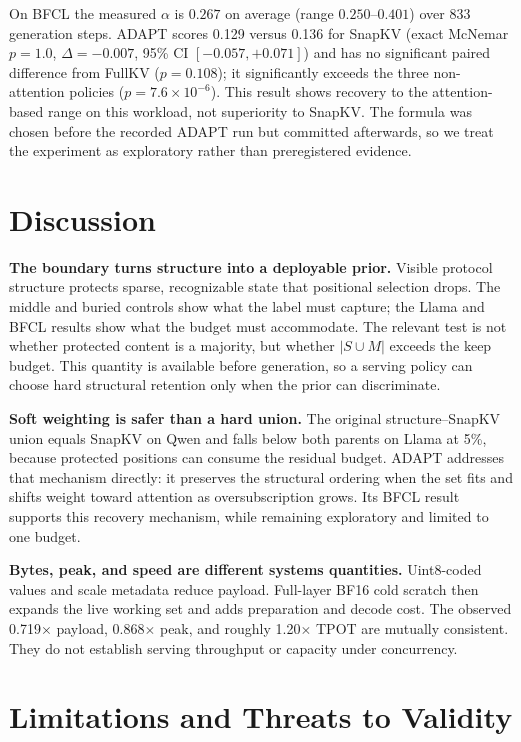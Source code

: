 On BFCL the measured $\alpha$ is $0.267$ on average (range $0.250$--$0.401$) over
833 generation steps.  ADAPT scores 0.129 versus 0.136 for SnapKV (exact McNemar
$p=1.0$, $\Delta=-0.007$, 95\% CI $[-0.057,+0.071]$) and has no significant
paired difference from FullKV ($p=0.108$); it significantly exceeds the three
non-attention policies ($p=7.6\times10^{-6}$).  This result shows recovery to the
attention-based range on this workload, not superiority to SnapKV.  The formula
was chosen before the recorded ADAPT run but committed afterwards, so we treat
the experiment as exploratory rather than preregistered evidence.

\section{Discussion}
\label{sec:discussion}

\textbf{The boundary turns structure into a deployable prior.}
Visible protocol structure protects sparse, recognizable state that positional
selection drops.  The middle and buried controls show what the label must
capture; the Llama and BFCL results show what the budget must accommodate.  The
relevant test is not whether protected content is a majority, but whether
$|S\cup M|$ exceeds the keep budget.  This quantity is available before
generation, so a serving policy can choose hard structural retention only when
the prior can discriminate.

\textbf{Soft weighting is safer than a hard union.}
The original structure--SnapKV union equals SnapKV on Qwen and falls below both
parents on Llama at 5\%, because protected positions can consume the residual
budget.  ADAPT addresses that mechanism directly: it preserves the structural
ordering when the set fits and shifts weight toward attention as
oversubscription grows.  Its BFCL result supports this recovery mechanism, while
remaining exploratory and limited to one budget.

\textbf{Bytes, peak, and speed are different systems quantities.}
Uint8-coded values and scale metadata reduce payload.  Full-layer BF16
cold scratch then expands the live working set and adds preparation and decode
cost.  The observed 0.719$\times$ payload, 0.868$\times$ peak, and roughly
1.20$\times$ TPOT are mutually consistent.  They do not establish serving
throughput or capacity under concurrency.

\section{Limitations and Threats to Validity}
\label{sec:limitations}

